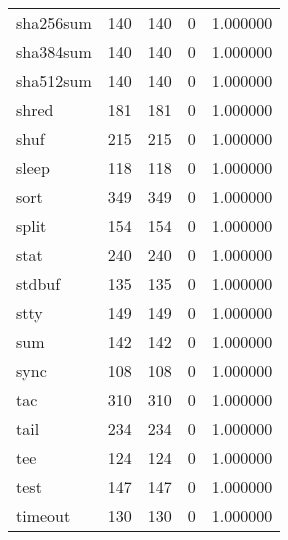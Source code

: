 \begin{tabular}{lrrrr}
sha256sum &                     140 &              140 &                 0 &                     1.000000 \\
sha384sum &                     140 &              140 &                 0 &                     1.000000 \\
sha512sum &                     140 &              140 &                 0 &                     1.000000 \\
shred     &                     181 &              181 &                 0 &                     1.000000 \\
shuf      &                     215 &              215 &                 0 &                     1.000000 \\
sleep     &                     118 &              118 &                 0 &                     1.000000 \\
sort      &                     349 &              349 &                 0 &                     1.000000 \\
split     &                     154 &              154 &                 0 &                     1.000000 \\
stat      &                     240 &              240 &                 0 &                     1.000000 \\
stdbuf    &                     135 &              135 &                 0 &                     1.000000 \\
stty      &                     149 &              149 &                 0 &                     1.000000 \\
sum       &                     142 &              142 &                 0 &                     1.000000 \\
sync      &                     108 &              108 &                 0 &                     1.000000 \\
tac       &                     310 &              310 &                 0 &                     1.000000 \\
tail      &                     234 &              234 &                 0 &                     1.000000 \\
tee       &                     124 &              124 &                 0 &                     1.000000 \\
test      &                     147 &              147 &                 0 &                     1.000000 \\
timeout   &                     130 &              130 &                 0 &                     1.000000 \\

\end{tabular}
